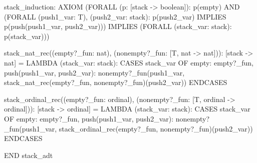   
  stack_induction: AXIOM
    (FORALL (p: [stack -> boolean]):
       p(empty)
         AND
         (FORALL (push1_var: T), (push2_var: stack):
            p(push2_var) IMPLIES p(push(push1_var, push2_var)))
         IMPLIES (FORALL (stack_var: stack): p(stack_var)))
  
  stack_nat_rec((empty?_fun: nat), (nonempty?_fun: [T, nat -> nat])):
    [stack -> nat] =
        LAMBDA (stack_var: stack):
          CASES stack_var OF
            empty: empty?_fun,
            push(push1_var, push2_var):
                nonempty?_fun(push1_var,
                              stack_nat_rec(empty?_fun,
                                            nonempty?_fun)(push2_var))
          ENDCASES
  
  stack_ordinal_rec((empty?_fun: ordinal),
                    (nonempty?_fun: [T, ordinal -> ordinal])):
    [stack -> ordinal] =
        LAMBDA (stack_var: stack):
          CASES stack_var OF
            empty: empty?_fun,
            push(push1_var, push2_var):
                nonempty?_fun(push1_var,
                              stack_ordinal_rec(empty?_fun,
                                                nonempty?_fun)(push2_var))
          ENDCASES
  
  END stack_adt
